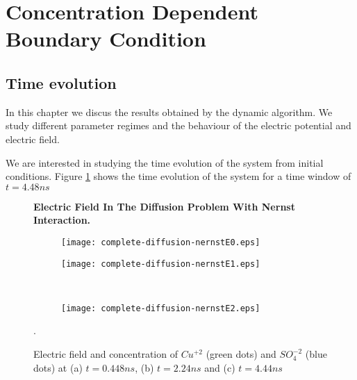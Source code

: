 \newpage
\section{Concentration Dependent Boundary Condition}
\subsection{Time evolution}

In this chapter we discus the results obtained by the dynamic algorithm. We study different parameter regimes and the behaviour of the electric potential and electric field.

We are interested in studying the time evolution of the system from initial conditions. Figure \ref{fig:ef1} shows the time evolution of the system for a time window of $t = 4.48 ns$




\begin{figure}[htbp]
\centering
\textbf{Electric Field In The Diffusion Problem With Nernst Interaction.}\par\medskip
\begin{subfigure}{.5\linewidth}
\centering
\texttt{[image: complete-diffusion-nernstE0.eps]}
\caption{}
\label{fig:ef1}
\end{subfigure}%
\begin{subfigure}{.5\linewidth}
\centering
\texttt{[image: complete-diffusion-nernstE1.eps]}
\caption{}
\label{fig:ef2}
\end{subfigure}\\[1ex]
\begin{subfigure}{\linewidth}
\centering
\texttt{[image: complete-diffusion-nernstE2.eps]}
\caption{}
\label{fig:ef3}
\end{subfigure}
\caption{Electric field and concentration of $Cu^{+2}$ (green dots) and $SO_4^{-2}$ (blue dots) at (a) $t = 0.448 ns$, (b) $t = 2.24 ns$ and (c) $t = 4.44 ns$}.
\label{fig:test}
\end{figure}


